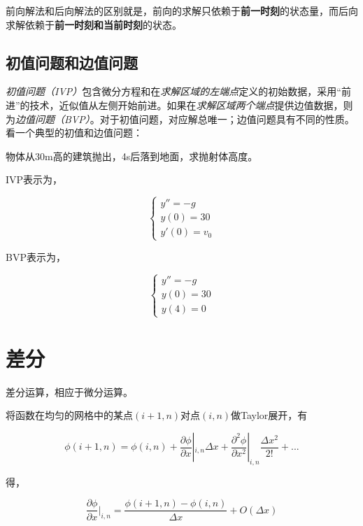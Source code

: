 前向解法和后向解法的区别就是，前向的求解只依赖于\textbf{前一时刻}的状态量，而后向求解依赖于\textbf{前一时刻和当前时刻}的状态。

\subsection{初值问题和边值问题}

\textit{初值问题（IVP）}包含微分方程和在\textit{求解区域的左端点}定义的初始数据，采用“前进”的技术，近似值从左侧开始前进。如果在\textit{求解区域两个端点}提供边值数据，则为\textit{边值问题（BVP）}。对于初值问题，对应解总唯一；边值问题具有不同的性质。看一个典型的初值和边值问题：

物体从30\si{\meter}高的建筑抛出，4\si{\second}后落到地面，求抛射体高度。

IVP表示为，

\begin{equation}
\begin{cases}
y''=-g \\
y(0) = 30 \\
y'(0) = v_0
\end{cases}
\end{equation}

BVP表示为，

\begin{equation}
\begin{cases}
y'' = -g \\
y(0) = 30 \\
y(4) = 0
\end{cases}
\end{equation}

\section{差分}

差分运算，相应于微分运算。

将函数在均匀的网格中的某点$ (i+1,n) $对点$ (i,n) $做Taylor展开，有

\begin{equation}
\phi(i+1,n) = \phi(i,n) + \frac{\partial\phi}{\partial x}|_{i,n}\Delta x +
\frac{\partial^2\phi}{\partial x^2}|_{i,n}\frac{\Delta x^2}{2!} + ...
\end{equation}

得，

\begin{equation}
\frac{\partial\phi}{\partial x}|_{i,n} = 
\frac{\phi(i+1,n)-\phi(i,n)}{\Delta x} + O(\Delta x)
\end{equation}

